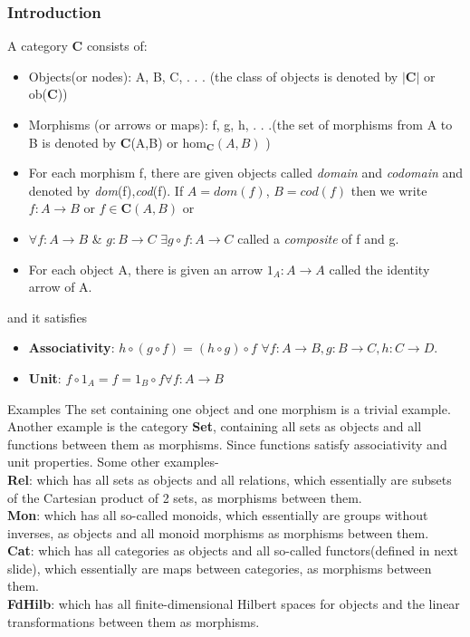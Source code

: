 \documentclass[11pt]{beamer}
\begin{document}
\begin{frame}
\frametitle{Introduction}
\begin{definition}
\fontsize{10}{12}\selectfont
A category \textbf{C} consists of:
\begin{itemize}
    \item Objects(or nodes): A, B, C, . . . (the class of objects is denoted by \(|{\textbf{C}}|\) or ob(\textbf{C}))
    \item Morphisms (or arrows or maps): f, g, h, . . .(the set of morphisms from A to B is denoted by \textbf{C}(A,B) or hom$_{\textbf{C}}(A,B)$ )
    \item For each morphism f, there are given objects called \textit{domain} and \textit{codomain} and denoted by \textit{dom}(f),\textit{cod}(f). If $A=\textit{dom}(f)$, $B=\textit{cod}(f)$ then we write $f:A\rightarrow B$ or $f \in \textbf{C}(A,B)$ or 
    \item $\forall f:A\rightarrow B$ \& $g:B\rightarrow C$ $\exists g \circ f:A\rightarrow C$ called a \textit{composite}  of f and g.
    \item For each object A, there is given an arrow $1_A : A \rightarrow A$ called the identity arrow of A.
\end{itemize}
and it satisfies 
\begin{itemize}
    \item \textbf{Associativity}: $h \circ (g \circ f) = (h \circ g) \circ f$  $\forall 
f:A\rightarrow B, g:B\rightarrow C,h:C\rightarrow D$.
    \item \textbf{Unit}: $f \circ 1_A = f = 1_B \circ f \forall f : A \rightarrow B$
\end{itemize}

\end{definition}
\end{frame}
\begin{frame}{Examples}
The set containing one object and one morphism is a trivial example. Another example is the category \textbf{Set}, containing all sets as objects and all functions between them as morphisms. Since functions satisfy associativity and unit properties. Some other examples-\\
\textbf{Rel}: which has all sets as objects and all relations, which essentially are subsets of the Cartesian product of 2 sets, as morphisms between them.\\
\textbf{Mon}: which has all so-called monoids, which essentially are groups without inverses, as
objects and all monoid morphisms as morphisms between them.\\
\textbf{Cat}: which has all categories as objects and all so-called functors(defined in next slide), which essentially are maps between categories, as morphisms between them.\\
\textbf{FdHilb}: which has all finite-dimensional Hilbert spaces for objects and the linear transformations between them as morphisms. 
\end{frame}
\end{document}
